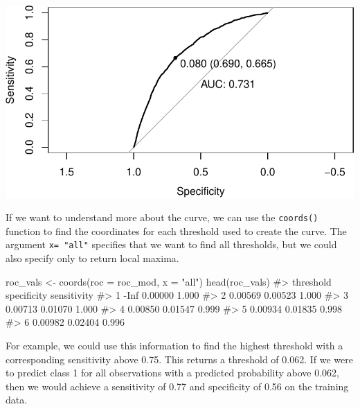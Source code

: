 \documentclass[
  letterpaper,
]{latex/krantz}
\makeatletter
\newenvironment{Shaded}{\begin{snugshade}}{\end{snugshade}}
\newcommand{\AttributeTok}[1]{\textcolor[rgb]{0.40,0.45,0.13}{#1}}
\newcommand{\CommentTok}[1]{\textcolor[rgb]{0.37,0.37,0.37}{#1}}
\newcommand{\FunctionTok}[1]{\textcolor[rgb]{0.28,0.35,0.67}{#1}}
\newcommand{\NormalTok}[1]{\textcolor[rgb]{0.00,0.23,0.31}{#1}}
\newcommand{\OtherTok}[1]{\textcolor[rgb]{0.00,0.23,0.31}{#1}}
\newcommand{\StringTok}[1]{\textcolor[rgb]{0.13,0.47,0.30}{#1}}
\newenvironment{kframe}{%
\medskip{}
\setlength{\fboxsep}{.8em}
 \def\at@end@of@kframe{}%
 \ifinner\ifhmode%
  \def\at@end@of@kframe{\end{minipage}}%
  \begin{minipage}{\columnwidth}%
 \fi\fi%
 \def\FrameCommand##1{\hskip\@totalleftmargin \hskip-\fboxsep
 \colorbox{shadecolor}{##1}\hskip-\fboxsep
     \hskip-\linewidth \hskip-\@totalleftmargin \hskip\columnwidth}%
 \MakeFramed {\advance\hsize-\width
   \@totalleftmargin\z@ \linewidth\hsize
   \@setminipage}}%
 {\par\unskip\endMakeFramed%
 \at@end@of@kframe}
\renewenvironment{Shaded}{\begin{kframe}}{\end{kframe}}
\makeatother
\begin{document}
\begin{center}
\includegraphics[width=1\textwidth,height=\textheight]{book/logistic_regression_files/figure-pdf/unnamed-chunk-10-1.pdf}
\end{center}

If we want to understand more about the curve, we can use the
\texttt{coords()} function
to find the coordinates for each threshold used to create the curve. The
argument \texttt{x=\ "all"} specifies that we want to find all
thresholds, but we could also specify only to return local maxima.

\begin{Shaded}
\begin{Highlighting}[]
\NormalTok{roc\_vals }\OtherTok{\textless{}{-}} \FunctionTok{coords}\NormalTok{(}\AttributeTok{roc =}\NormalTok{ roc\_mod, }\AttributeTok{x =} \StringTok{"all"}\NormalTok{)}
\FunctionTok{head}\NormalTok{(roc\_vals)}
\CommentTok{\#\textgreater{}   threshold specificity sensitivity}
\CommentTok{\#\textgreater{} 1      {-}Inf     0.00000       1.000}
\CommentTok{\#\textgreater{} 2   0.00569     0.00523       1.000}
\CommentTok{\#\textgreater{} 3   0.00713     0.01070       1.000}
\CommentTok{\#\textgreater{} 4   0.00850     0.01547       0.999}
\CommentTok{\#\textgreater{} 5   0.00934     0.01835       0.998}
\CommentTok{\#\textgreater{} 6   0.00982     0.02404       0.996}
\end{Highlighting}
\end{Shaded}

For example, we could use this information to find the highest threshold
with a corresponding sensitivity above 0.75. This returns a threshold of
0.062. If we were to predict class 1 for all observations with a
predicted probability above 0.062, then we would achieve a sensitivity
of 0.77 and specificity of 0.56 on the training data.
\end{document}
